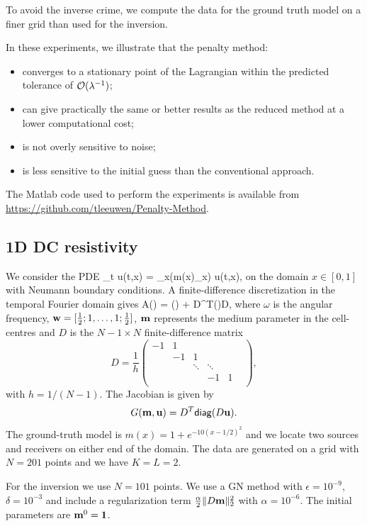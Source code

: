 \documentclass{iopart}
\begin{document}
To avoid the inverse crime, we compute the data for the ground truth model on a finer grid than used for the inversion. 

In these experiments, we illustrate that the penalty method: 
\begin{itemize}
\item converges to a stationary point of the Lagrangian within the predicted tolerance of $\mathcal{O}(\lambda^{-1})$;
\item can give practically the same or better results as the reduced method at a lower computational cost;
\item is not overly sensitive to noise;
\item is less sensitive to the initial guess than the conventional approach.
\end{itemize}
The Matlab code used to perform the experiments is available from \url{https://github.com/tleeuwen/Penalty-Method}.

\subsection{1D DC resistivity}
We consider the PDE
\bq
\partial_t u(t,x) = \partial_x\left(m(x)\partial_x\right) u(t,x),
\eq
on the domain $x \in [0,1]$ with Neumann boundary conditions. 
A finite-difference discretization in the temporal Fourier domain gives
\bq
A() = \imath\omega{}() + D^T()D,
\eq
where $\omega$ is the angular frequency, $\mathbf{w} = [\frac{1}{2}; 1, \ldots, 1; \frac{1}{2}]$, $\mathbf{m}$ represents 
the medium parameter in the cell-centres and $D$ is the $N-1\times N$ finite-difference matrix
\[
D=\frac{1}{h}\left(\begin{array}{cccccc} 
-1& 1&   &  &      &   \\
  &-1& 1 &  &      &   \\
  &  &\ddots&\ddots&   \\
  &  &      & -1   & 1 \\
\end{array}\right),
\]
with $h=1/(N-1)$. The Jacobian is given by 
\[
G(\mathbf{m},\mathbf{u}) = D^T\mathsf{diag}(D\mathbf{u}).
\]
The ground-truth model is $m(x) = 1+e^{-10(x-1/2)^2}$ and we locate two sources and receivers on either end of the domain. The data are generated on a grid with $N=201$ points and we have $K=L=2$.

For the inversion we use $N=101$ points.
We use a GN method with $\epsilon=10^{-9}$, $\delta=10^{-3}$ and include a regularization term $\frac{\alpha}{2} \|D\mathbf{m}\|_2^2$ with $\alpha = 10^{-6}$.
The initial parameters are $\mathbf{m}^0 = \mathbf{1}$.
\end{document}

